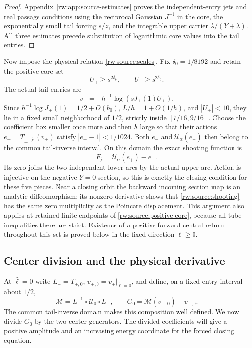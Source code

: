 \begin{proof}
Appendix~\ref{rw:app:source-estimates} proves the independent-entry
jets and real passage conditions using the reciprocal Gaussian
$J^{-1}$ in the core, the exponentially small tail forcing $s/z$,
and the integrable upper carrier $\lambda/(Y+\lambda)$.
All three estimates precede substitution of logarithmic core values
into the tail entries.
\end{proof}

Now impose the physical relation \eqref{rw:source:scales}. Fix
$\delta_0=1/8192$ and retain the positive-core set
\begin{equation}\label{rw:source:positive-core}
 U_+\ge s^{2\delta_0},\qquad U_-\ge s^{2\delta_0}.
\end{equation}
The actual tail entries are
\[
 v_\pm=-h^{-1}\log(sJ_\pm(1)U_\pm).
\]
Since $h^{-1}\log J_\pm(1)=1/2+O(b_0)$,
$L/h=1+O(1/h)$, and $|U_\pm|<10$, they lie in a fixed small
neighborhood of $1/2$, strictly inside $[7/16,9/16]$.
Choose the coefficient box smaller once more and then $h$ large so
that their actions $e_\pm=T_{\pm,\widehat\ell}(v_\pm)$ satisfy
$|e_\pm-1|<1/1024$. Both $e_-$ and
$\mathcal U_\alpha(e_+)$ then belong to the common tail-inverse
interval. On this domain the exact shooting function is
\begin{equation}\label{rw:source:shooting}
 F_{\widehat\ell}=\mathcal U_\alpha(e_+)-e_-.
\end{equation}
Its zero joins the two independent lower arcs by the actual upper arc.
Action is injective on the negative $Y=0$ section, so this is exactly
the closing condition for these five pieces. Near a closing orbit the
backward incoming section map is an analytic diffeomorphism; its
nonzero derivative shows that \eqref{rw:source:shooting} has the
same zero multiplicity as the Poincare displacement. This argument
also applies at retained finite endpoints of
\eqref{rw:source:positive-core}, because all tube inequalities there
are strict. Existence of a positive forward central return throughout
this set is proved below in the fixed direction $\ell\ge0$.

\subsection{Center division and the physical derivative}

At $\widehat\ell=0$ write $L_\pm=T_{\pm,0}$,
$v_{\pm,0}=v_\pm|_{\widehat\ell=0}$, and define, on a fixed entry
interval about $1/2$,
\begin{equation}\label{rw:source:unforced-map}
 \mathcal M=L_-^{-1}\circ\mathcal U_0\circ L_+,
 \qquad G_0=\mathcal M(v_{+,0})-v_{-,0}.
\end{equation}
The common tail-inverse domain makes this composition well defined.
We now divide $G_0$ by the two center generators. The divided
coefficients will give a positive amplitude and an increasing energy
coordinate for the forced closing equation.

